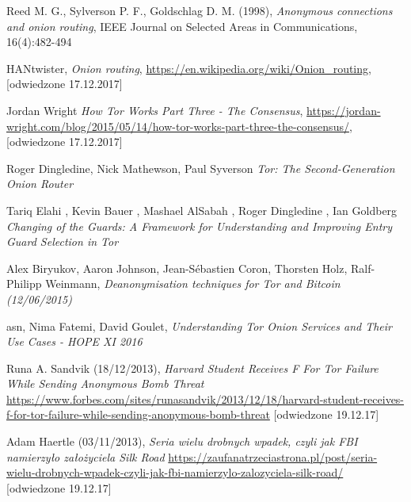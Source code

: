 \documentclass[polish]{kbk}
\begin{document}
\begin{thebibliography}{99}

 Reed M. G., Sylverson P. F., Goldschlag D. M. (1998), 
\textit{Anonymous connections and onion routing},
IEEE Journal on Selected Areas in Communications, 16(4):482-494

 HANtwister, 
\textit{Onion routing},
\url{https://en.wikipedia.org/wiki/Onion_routing},
[odwiedzone 17.12.2017]

 Jordan Wright
\textit{How Tor Works Part Three - The Consensus},
\url{https://jordan-wright.com/blog/2015/05/14/how-tor-works-part-three-the-consensus/},
[odwiedzone 17.12.2017]

 Roger Dingledine, Nick Mathewson, Paul Syverson
\textit{Tor: The Second-Generation Onion Router}

 Tariq Elahi
, Kevin Bauer
, Mashael AlSabah
, Roger Dingledine
, Ian Goldberg
\textit{Changing of the Guards: A Framework for Understanding and Improving Entry 
Guard Selection in Tor}

 Alex Biryukov,
Aaron Johnson,
Jean-Sébastien Coron, 
Thorsten Holz,
Ralf-Philipp Weinmann, 
\textit{Deanonymisation techniques for Tor and Bitcoin (12/06/2015) }

 asn, 
Nima Fatemi, 
David Goulet,
\textit{Understanding Tor Onion Services and Their Use Cases - HOPE XI 2016}

 Runa A. Sandvik (18/12/2013),
\textit{Harvard Student Receives F For Tor Failure While Sending Anonymous Bomb Threat}
\url{https://www.forbes.com/sites/runasandvik/2013/12/18/harvard-student-receives-f-for-tor-failure-while-sending-anonymous-bomb-threat}
[odwiedzone 19.12.17]

 Adam Haertle (03/11/2013),
\textit{Seria wielu drobnych wpadek, czyli jak FBI namierzyło założyciela Silk Road}
\url{https://zaufanatrzeciastrona.pl/post/seria-wielu-drobnych-wpadek-czyli-jak-fbi-namierzylo-zalozyciela-silk-road/}
[odwiedzone 19.12.17]


\end{thebibliography}
\end{document}
